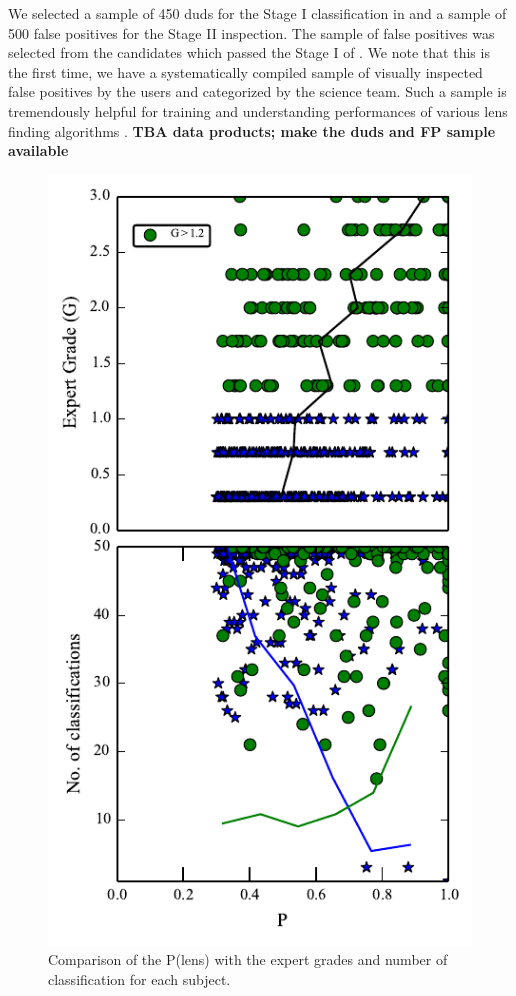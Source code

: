 \documentclass[useAMS,usenatbib,a4paper]{mn2e}
\begin{document}
We selected a sample of 450 duds for the Stage I classification in \sw
and a sample of 500 false positives for the Stage II
inspection. The sample of false positives was selected from
the candidates which passed the Stage I of \sw. We note that this is the
first time, we have a systematically compiled sample of visually
inspected false positives by the \sw users and categorized by the
science team. Such a sample is tremendously helpful for training and
understanding performances of various lens finding algorithms
\citep{Chan2014}. {\bf TBA data products; make the duds and FP sample available}


\begin{figure}
\begin{center}
\includegraphics[scale=1.0]{sw-cfhtls-figs/poffl_expr_ncl.pdf}
\caption{ \label{fig:exp_pn} Comparison of the P(lens) with the expert
grades and number of classification for each subject.  }
\end{center}
\end{figure}
\end{document}
